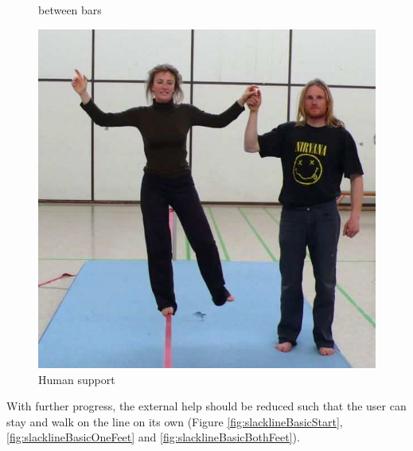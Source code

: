 \begin{figure}[htb]
\begin{minipage}[t]{0.38\linewidth}
		\caption{between bars \cite{Kroiss2007-ab}}
		\label{fig:slacklineHelpBar}
	\end{minipage}
	\hfill
	\begin{minipage}[t]{0.3\linewidth}
		\centering
		\includegraphics[width=1\linewidth]{Pictures/slacklineHelpHuman}
		\caption{Human support \cite{Kroiss2007-ab}}
		\label{fig:slacklineHelpHuman}
	\end{minipage}
\end{figure}

With further progress, the external help should be reduced such that the user can stay and walk on the line on its own (Figure \ref{fig:slacklineBasicStart}, \ref{fig:slacklineBasicOneFeet} and \ref{fig:slacklineBasicBothFeet}). 

